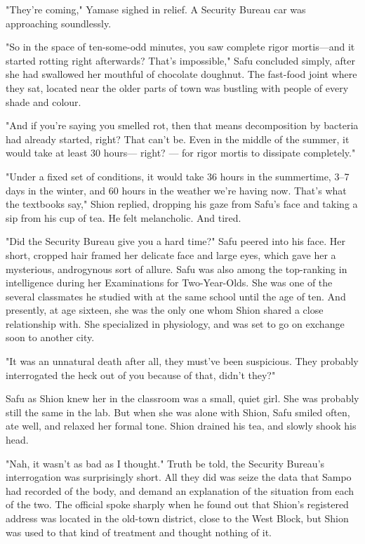"They're coming," Yamase sighed in relief. A Security Bureau car was
approaching soundlessly.

\mybreak

"So in the space of ten-some-odd minutes, you saw complete rigor
mortis---and it started rotting right afterwards? That's impossible," Safu
concluded simply, after she had swallowed her mouthful of chocolate
doughnut. The fast-food joint where they sat, located near the older
parts of town was bustling with people of every shade and colour.

"And if you're saying you smelled rot, then that means decomposition by
bacteria had already started, right? That can't be. Even in the middle
of the summer, it would take at least 30 hours--- right? --- for rigor
mortis to dissipate completely."

"Under a fixed set of conditions, it would take 36 hours in the
summertime, 3--7 days in the winter, and 60 hours in the weather we're
having now. That's what the textbooks say," Shion replied, dropping his
gaze from Safu's face and taking a sip from his cup of tea. He felt
melancholic. And tired.

"Did the Security Bureau give you a hard time?" Safu peered into his
face. Her short, cropped hair framed her delicate face and large eyes,
which gave her a mysterious, androgynous sort of allure. Safu was also
among the top-ranking in intelligence during her Examinations for
Two-Year-Olds. She was one of the several classmates he studied with at
the same school until the age of ten. And presently, at age sixteen, she
was the only one whom Shion shared a close relationship with. She
specialized in physiology, and was set to go on exchange soon to another
city.

"It was an unnatural death after all, they must've been suspicious. They
probably interrogated the heck out of you because of that, didn't they?"

Safu as Shion knew her in the classroom was a small, quiet girl. She was
probably still the same in the lab. But when she was alone with Shion,
Safu smiled often, ate well, and relaxed her formal tone. Shion drained
his tea, and slowly shook his head.

"Nah, it wasn't as bad as I thought." Truth be told, the Security
Bureau's interrogation was surprisingly short. All they did was seize
the data that Sampo had recorded of the body, and demand an explanation
of the situation from each of the two. The official spoke sharply when
he found out that Shion's registered address was located in the old-town
district, close to the West Block, but Shion was used to that kind of
treatment and thought nothing of it.

